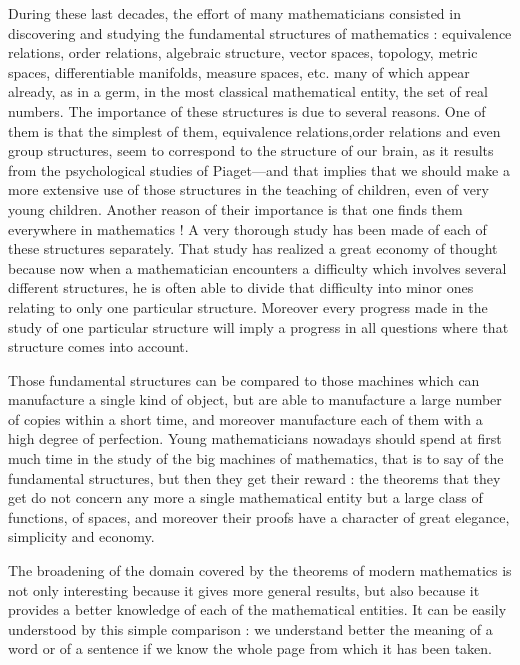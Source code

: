During these last decades, the effort of many mathematicians consisted in discovering and studying the fundamental structures of mathematics : equivalence relations, order relations, algebraic structure, vector spaces, topology, metric spaces, differentiable manifolds, measure spaces, etc. many of which appear already, as in a germ, in the most classical mathematical entity, the set of real numbers. The importance of these structures is due to several reasons. One of them is that the simplest of them, equivalence relations,\pageoriginale order relations and even group structures, seem to correspond to the structure of our brain, as it results from the psychological studies of Piaget---and that implies that we should make a more extensive use of those structures in the teaching of children, even of very young children. Another reason of their importance is that one finds them everywhere in mathematics ! A very thorough study has been made of each of these structures separately. That study has realized a great economy of thought because now when a mathematician encounters a difficulty which involves several different structures, he is often able to divide that difficulty into minor ones relating to only one particular structure. Moreover every progress made in the study of one particular structure will imply a progress in all questions where that structure comes into account.

Those fundamental structures can be compared to those machines which can manufacture a single kind of object, but are able to manufacture a large number of copies within a short time, and moreover manufacture each of them with a high degree of perfection. Young mathematicians nowadays should spend at first much time in the study of the big machines of mathematics, that is to say of the fundamental structures, but then they get their reward : the theorems that they get do not concern any more a single mathematical entity but a large class of functions, of spaces, and moreover their proofs have a character of great elegance, simplicity and economy.

The broadening of the domain covered by the theorems of modern mathematics is not only interesting because it gives more general results, but also because it provides a better knowledge of each of the mathematical entities. It can be easily understood by this simple comparison : we understand better the meaning of a word or of a sentence if we know the whole page from which it has been taken.

